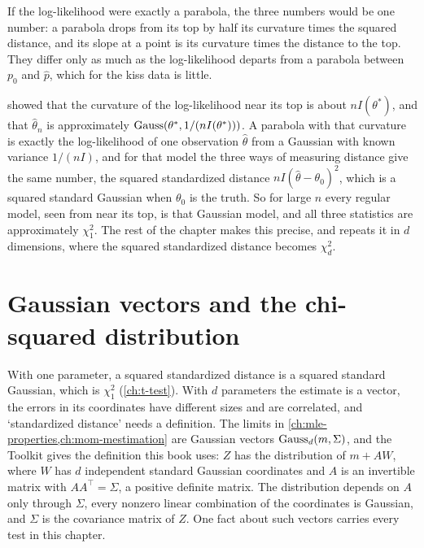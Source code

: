 If the log-likelihood were exactly a parabola, the three numbers would be one number: a parabola drops from its top by half its curvature times the squared distance, and its slope at a point is its curvature times the distance to the top.
They differ only as much as the log-likelihood departs from a parabola between $p_0$ and $\hat{p}$, which for the kiss data is little.

\begin{intuition}
 showed that the curvature of the log-likelihood near its top is about $nI(\theta^*)$, and that $\hat{\theta}_n$ is approximately $\text{Gauss}(\theta^*, 1/(nI(\theta^*)))$.
A parabola with that curvature is exactly the log-likelihood of one observation $\hat{\theta}$ from a Gaussian with known variance $1/(nI)$, and for that model the three ways of measuring distance give the same number, the squared standardized distance $nI(\hat{\theta} - \theta_0)^2$, which is a squared standard Gaussian when $\theta_0$ is the truth.
So for large $n$ every regular model, seen from near its top, is that Gaussian model, and all three statistics are approximately $\chi^2_1$.
The rest of the chapter makes this precise, and repeats it in $d$ dimensions, where the squared standardized distance becomes $\chi^2_d$.
\end{intuition}

\section{Gaussian vectors and the chi-squared distribution}
\label{sec:wlr-gaussvec}

With one parameter, a squared standardized distance is a squared standard Gaussian, which is $\chi^2_1$ (\cref{ch:t-test}).
With $d$ parameters the estimate is a vector, the errors in its coordinates have different sizes and are correlated, and `standardized distance' needs a definition.
The limits in \cref{ch:mle-properties,ch:mom-mestimation} are Gaussian vectors $\text{Gauss}_d(m, \Sigma)$, and the Toolkit  gives the definition this book uses: $Z$ has the distribution of $m + AW$, where $W$ has $d$ independent standard Gaussian coordinates and $A$ is an invertible matrix with $AA^\top = \Sigma$, a positive definite matrix.
The distribution depends on $A$ only through $\Sigma$, every nonzero linear combination of the coordinates is Gaussian, and $\Sigma$ is the covariance matrix of $Z$.
One fact about such vectors carries every test in this chapter.

